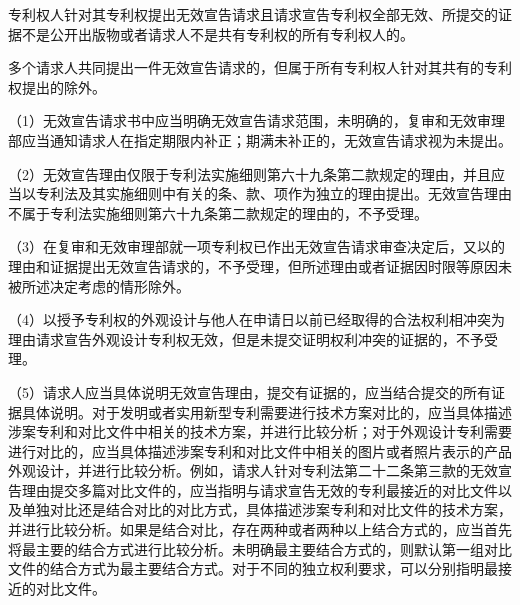 {\setlength{\parindent}{17.1bp}专利权人针对其专利权提出无效宣告请求且请求宣告专利权全部无效、所提交的证据不是公开出版物或者请求人不是共有专利权的所有专利权人的。\par}

{\setlength{\parindent}{17.1bp}多个请求人共同提出一件无效宣告请求的，但属于所有专利权人针对其共有的专利权提出的除外。\par}

{\setlength{\parindent}{17.1bp}（1）无效宣告请求书中应当明确无效宣告请求范围，未明确的，复审和无效审理部应当通知请求人在指定期限内补正；期满未补正的，无效宣告请求视为未提出。\par}

{\setlength{\parindent}{17.1bp}（2）无效宣告理由仅限于专利法实施细则第六十九条第二款规定的理由，并且应当以专利法及其实施细则中有关的条、款、项作为独立的理由提出。无效宣告理由不属于专利法实施细则第六十九条第二款规定的理由的，不予受理。\par}

{\setlength{\parindent}{17.1bp}（3）在复审和无效审理部就一项专利权已作出无效宣告请求审查决定后，又以的理由和证据提出无效宣告请求的，不予受理，但所述理由或者证据因时限等原因未被所述决定考虑的情形除外。\par}

{\setlength{\parindent}{17.1bp}（4）以授予专利权的外观设计与他人在申请日以前已经取得的合法权利相冲突为理由请求宣告外观设计专利权无效，但是未提交证明权利冲突的证据的，不予受理。\par}

{\setlength{\parindent}{17.1bp}（5）请求人应当具体说明无效宣告理由，提交有证据的，应当结合提交的所有证据具体说明。对于发明或者实用新型专利需要进行技术方案对比的，应当具体描述涉案专利和对比文件中相关的技术方案，并进行比较分析；对于外观设计专利需要进行对比的，应当具体描述涉案专利和对比文件中相关的图片或者照片表示的产品外观设计，并进行比较分析。例如，请求人针对专利法第二十二条第三款的无效宣告理由提交多篇对比文件的，应当指明与请求宣告无效的专利最接近的对比文件以及单独对比还是结合对比的对比方式，具体描述涉案专利和对比文件的技术方案，并进行比较分析。如果是结合对比，存在两种或者两种以上结合方式的，应当首先将最主要的结合方式进行比较分析。未明确最主要结合方式的，则默认第一组对比文件的结合方式为最主要结合方式。对于不同的独立权利要求，可以分别指明最接近的对比文件。\par}

